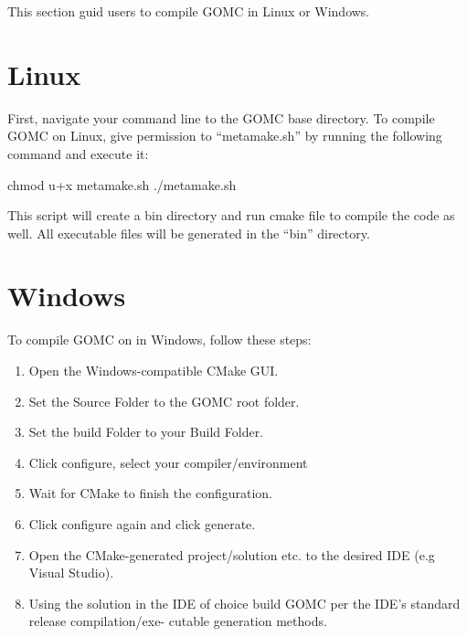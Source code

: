 \documentclass[letterpaper,10pt,english]{sphinxmanual}
\begin{document}
This section guid users to compile GOMC in Linux or Windows.


\section{Linux}
\label{\detokenize{compiling:linux}}
First, navigate your command line to the GOMC base directory. To compile GOMC on Linux, give permission to “metamake.sh” by running the following command and execute it:

%
\begin{sphinxVerbatim}[commandchars=\\\{\}]
\PYGZdl{} chmod u+x metamake.sh
\PYGZdl{} ./metamake.sh
\end{sphinxVerbatim}

This script will create a bin directory and run cmake file to compile the code as well. All executable files will be generated in the “bin” directory.


\section{Windows}
\label{\detokenize{compiling:windows}}
To compile GOMC on in Windows, follow these steps:
\begin{enumerate}
\item {} 
Open the Windows-compatible CMake GUI.

\item {} 
Set the Source Folder to the GOMC root folder.

\item {} 
Set the build Folder to your Build Folder.

\item {} 
Click configure, select your compiler/environment

\item {} 
Wait for CMake to finish the configuration.

\item {} 
Click configure again and click generate.

\item {} 
Open the CMake-generated project/solution etc. to the desired IDE (e.g Visual Studio).

\item {} 
Using the solution in the IDE of choice build GOMC per the IDE’s standard release compilation/exe- cutable generation methods.

\end{enumerate}
\end{document}
